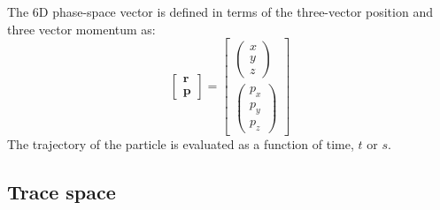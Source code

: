 The 6D phase-space vector is defined in terms of the three-vector
position and three vector momentum as:
\begin{equation}
  \begin{bmatrix} \bm{r} \\ \bm{p} \end{bmatrix} = 
  \begin{bmatrix} \begin{pmatrix} x   \\   y \\ z   \end{pmatrix} \\
                  \begin{pmatrix} p_x \\ p_y \\ p_z \end{pmatrix} \end{bmatrix}
\end{equation}
The trajectory of the particle is evaluated as a function of time,
$t$ or $s$.

\subsection{Trace space}

